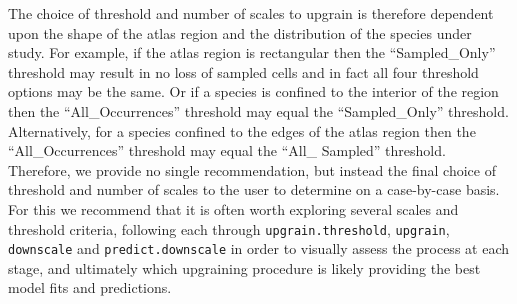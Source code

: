 \documentclass{article}[12pt, a4paper]
\begin{document}
The choice of threshold and number of scales to upgrain is therefore dependent upon the shape of the atlas region and the distribution of the species under study. For example, if the atlas region is rectangular then the “Sampled\_Only” threshold may result in no loss of sampled cells and in fact all four threshold options may be the same. Or if a species is confined to the interior of the region then the “All\_Occurrences” threshold may equal the “Sampled\_Only” threshold. Alternatively, for a species confined to the edges of the atlas region then the “All\_Occurrences” threshold may equal the “All\_ Sampled” threshold. Therefore, we provide no single recommendation, but instead the final choice of threshold and number of scales to the user to determine on a case-by-case basis. For this we recommend that it is often worth exploring several scales and threshold criteria, following each through \texttt{upgrain.threshold}, \texttt{upgrain}, \texttt{downscale} and \texttt{predict.downscale} in order to visually assess the process at each stage, and ultimately which upgraining procedure is likely providing the best model fits and predictions.
\end{document}
